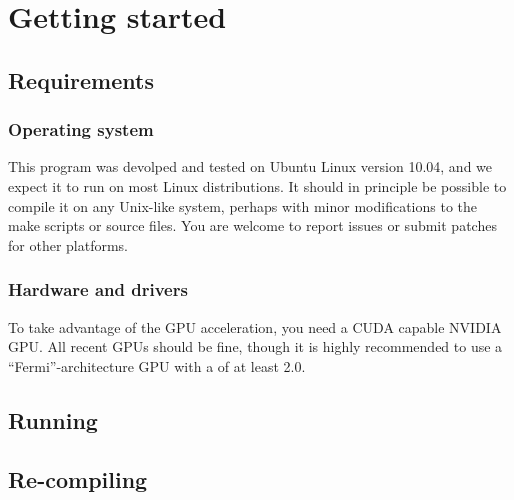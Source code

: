 \section{Getting started}

\subsection{Requirements}

\subsubsection{Operating system}

This program was devolped and tested on Ubuntu Linux version 10.04, and we expect it to run on most Linux distributions. It should in principle be possible to compile it on any Unix-like system, perhaps with minor modifications to the make scripts or source files. You are welcome to report issues or submit patches for other platforms.

\subsubsection{Hardware and drivers}


To take advantage of the GPU acceleration, you need a CUDA capable \textsc{NVIDIA} GPU. All recent GPUs should be fine, though it is highly recommended to use a ``Fermi''-architecture GPU with a  of at least 2.0. 


\subsection{Running}



\subsection{Re-compiling}




